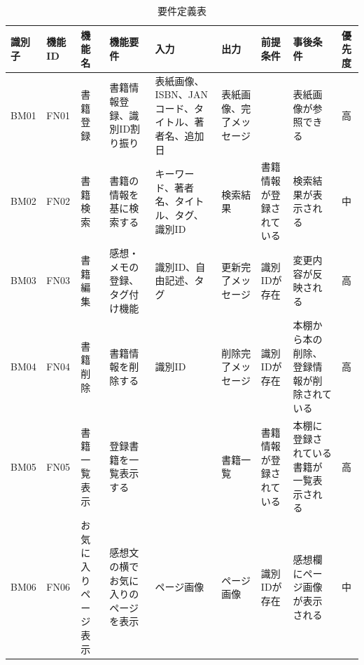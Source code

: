 \documentclass[a4paper, 11pt, titlepage]{jsarticle}
\begin{document}
\begin{table}[htbp]
  \centering
  \begin{tabular}{|>{\centering\arraybackslash}m{0.9cm}|>{\centering\arraybackslash}m{0.9cm}|>{\centering\arraybackslash}m{1.3cm}|>{\centering\arraybackslash}m{1.5cm}|>{\centering\arraybackslash}m{1.8cm}|>{\centering\arraybackslash}m{1.2cm}|>{\centering\arraybackslash}m{1.3cm}|>{\centering\arraybackslash}m{1.3cm}|>{\centering\arraybackslash}m{0.3cm}|}
    \hline
    \textbf{識別子} & \textbf{機能ID} & \textbf{機能名} & \textbf{機能要件} & \textbf{入力} & \textbf{出力} & \textbf{前提条件} & \textbf{事後条件} & \textbf{優先度} \\
    \hline\hline
    BM01 & FN01 & 書籍登録 & 書籍情報登録、識別ID割り振り & 表紙画像、ISBN、JANコード、タイトル、著者名、追加日 & 表紙画像、完了メッセージ & & 表紙画像が参照できる & 高 \\
    \hline
    BM02 & FN02 & 書籍検索 & 書籍の情報を基に検索する & キーワード、著者名、タイトル、タグ、識別ID & 検索結果 & 書籍情報が登録されている & 検索結果が表示される & 中 \\
    \hline
    BM03 & FN03 & 書籍編集 & 感想・メモの登録、タグ付け機能 & 識別ID、自由記述、タグ & 更新完了メッセージ & 識別IDが存在 & 変更内容が反映される & 高 \\
    \hline
    BM04 & FN04 & 書籍削除 & 書籍情報を削除する & 識別ID & 削除完了メッセージ & 識別IDが存在 & 本棚から本の削除、登録情報が削除されている & 高 \\
    \hline
    BM05 & FN05 & 書籍一覧表示 & 登録書籍を一覧表示する & & 書籍一覧 & 書籍情報が登録されている & 本棚に登録されている書籍が一覧表示される & 高 \\
    \hline
    BM06 & FN06 & お気に入りページ表示 & 感想文の横でお気に入りのページを表示 & ページ画像 & ページ画像 & 識別IDが存在 & 感想欄にページ画像が表示される & 中 \\
    \hline
  \end{tabular}
  \caption{要件定義表}
  \label{tab:requirements}
\end{table}

\clearpage
\end{document}
